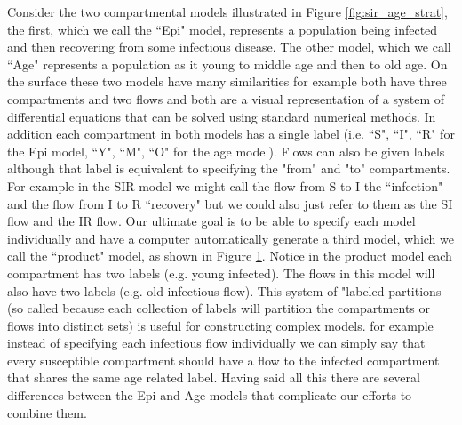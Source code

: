 \documentclass[pdflatex,sn-basic]{sn-jnl}%
\theoremstyle{definition}
\begin{document}
\begin{figure}
    \centering
    
    \caption{}
    \label{fig:simple_sir_age}
\end{figure}

Consider the two compartmental models illustrated in Figure \ref{fig:sir_age_strat}, the first, which we call the ``Epi" model, represents a population being infected and then recovering from some infectious disease. The other model, which we call ``Age" represents a population as it young to middle age and then to old age. On the surface these two models have many similarities for example both have three compartments and two flows and both are a visual representation of a system of differential equations that can be solved using standard numerical methods. In addition each compartment in both models has a single label (i.e. ``S", ``I", ``R" for the Epi model, ``Y", ``M", ``O" for the age model). Flows can also be given labels although that label is equivalent to specifying the "from" and "to" compartments. For example in the SIR model we might call the flow from S to I the ``infection" and the flow from I to R ``recovery" but we could also just refer to them as the SI flow and the IR flow. Our ultimate goal is to be able to specify each model individually and have a computer automatically generate a third model, which we call the ``product" model, as shown in Figure \ref{fig:simple_sir_age}. Notice in the product model each compartment has two labels (e.g. young infected). The flows in this model will also have two labels (e.g. old infectious flow). This system of "labeled partitions (so called because each collection of labels will partition the compartments or flows into distinct sets) is useful for constructing complex models. for example instead of specifying each infectious flow individually we can simply say that every susceptible compartment should have a flow to the infected compartment that shares the same age related label. Having said all this there are several differences between the Epi and Age models that complicate our efforts to combine them.
\end{document}
